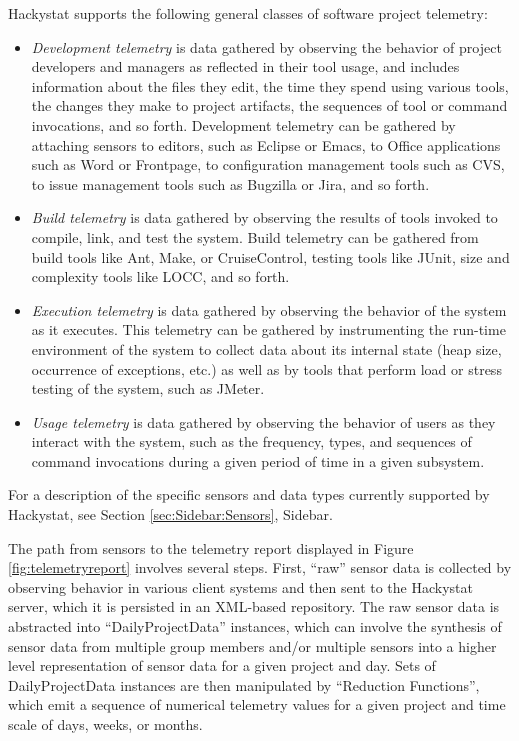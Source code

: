 \documentclass[11pt,twocolumn]{article}
\begin{document}
Hackystat supports the following general classes of software project telemetry:

\begin{itemize}

\item {\em Development telemetry} is data gathered by observing the
behavior of project developers and managers as reflected in their tool
usage, and includes information about the files they edit, the time they
spend using various tools, the changes they make to project artifacts, the
sequences of tool or command invocations, and so forth. Development
telemetry can be gathered by attaching sensors to editors, such as Eclipse
or Emacs, to Office applications such as Word or Frontpage, to
configuration management tools such as CVS, to issue management tools such
as Bugzilla or Jira, and so forth.

\item {\em Build telemetry} is data gathered by observing the results of
tools invoked to compile, link, and test the system. Build telemetry can be
gathered from build tools like Ant, Make, or CruiseControl, testing tools
like JUnit, size and complexity tools like LOCC, and so forth.

\item {\em Execution telemetry} is data gathered by observing the behavior of
the system as it executes. This telemetry can be gathered by instrumenting
the run-time environment of the system to collect data about its internal
state (heap size, occurrence of exceptions, etc.) as well as by tools that
perform load or stress testing of the system, such as JMeter.  

\item {\em Usage telemetry} is data gathered by observing the behavior of
users as they interact with the system, such as the frequency, types, and sequences
of command invocations during a given period of time in a given subsystem.

\end{itemize}

For a description of the specific sensors and data types currently supported by
Hackystat, see Section \ref{sec:Sidebar:Sensors}, Sidebar.  


The path from sensors to the telemetry report displayed in Figure
\ref{fig:telemetryreport} involves several steps.  First, ``raw'' sensor
data is collected by observing behavior in various client systems and then
sent to the Hackystat server, which it is persisted in an XML-based
repository.  The raw sensor data is abstracted into ``DailyProjectData''
instances, which can involve the synthesis of sensor data from multiple
group members and/or multiple sensors into a higher level representation of
sensor data for a given project and day.   Sets of DailyProjectData
instances are then manipulated by ``Reduction Functions'', which emit a
sequence of numerical telemetry values for a given project and time scale
of days, weeks, or months.  
\end{document}
